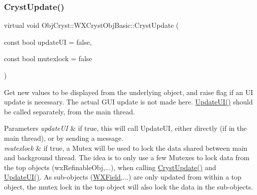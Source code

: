 \subsubsection{\texorpdfstring{CrystUpdate()}{CrystUpdate()}}
{\footnotesize\ttfamily virtual void Obj\+Cryst\+::\+W\+X\+Cryst\+Obj\+Basic\+::\+Cryst\+Update (\begin{DoxyParamCaption}\item[{const bool}]{update\+UI = {\ttfamily false},  }\item[{const bool}]{mutexlock = {\ttfamily false} }\end{DoxyParamCaption})\hspace{0.3cm}{\ttfamily [pure virtual]}}

Get new values to be displayed from the underlying object, and raise flag if an UI update is necessary. The actual G\+UI update is not made here. \mbox{\hyperlink{class_obj_cryst_1_1_w_x_cryst_obj_basic_a3818940b7031ff7e45cf2178c4a99c90}{Update\+U\+I()}} should be called separately, from the main thread.


\begin{DoxyParams}{Parameters}
{\em update\+UI} & if true, this will call Update\+UI, either directly (if in the main thread), or by sending a message. \\
\hline
{\em mutexlock} & if true, a Mutex will be used to lock the data shared between main and background thread. The idea is to only use a few Mutexes to lock data from the top objects (wx\+Refinable\+Obj,...), when calling \mbox{\hyperlink{class_obj_cryst_1_1_w_x_cryst_obj_basic_a7ac00ae2ae28f1a6fa26e6fa571186b6}{Cryst\+Update()}} and \mbox{\hyperlink{class_obj_cryst_1_1_w_x_cryst_obj_basic_a3818940b7031ff7e45cf2178c4a99c90}{Update\+U\+I()}}. As sub-\/objects (\mbox{\hyperlink{class_obj_cryst_1_1_w_x_field}{W\+X\+Field}},...) are only updated from within a top object, the mutex lock in the top object will also lock the data in the sub-\/objects. \\
\hline
\end{DoxyParams}


